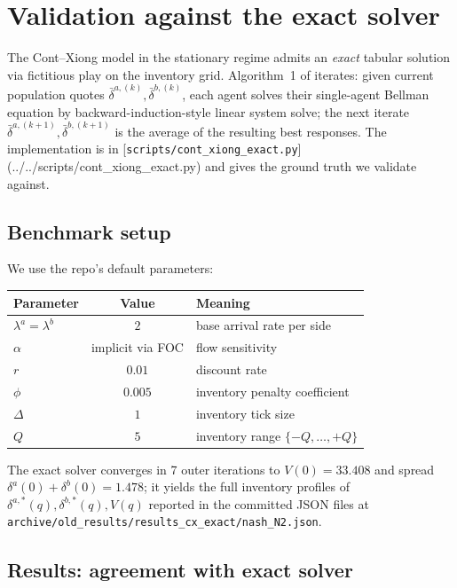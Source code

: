 \section{Validation against the exact solver}
\label{sec:validation}

The Cont--Xiong model in the stationary regime admits an \emph{exact} tabular solution via fictitious play on the inventory grid. Algorithm~1 of \cite{cont2024} iterates: given current population quotes $\bar \delta^{a, (k)}, \bar \delta^{b, (k)}$, each agent solves their single-agent Bellman equation by backward-induction-style linear system solve; the next iterate $\bar \delta^{a, (k+1)}, \bar \delta^{b, (k+1)}$ is the average of the resulting best responses. The implementation is in [\texttt{scripts/cont\_xiong\_exact.py}](../../scripts/cont_xiong_exact.py) and gives the ground truth we validate against.

\subsection{Benchmark setup}

We use the repo's default parameters:
\begin{table}[h]
\centering
\begin{tabular}{@{}lcl@{}}
\toprule
Parameter & Value & Meaning \\ \midrule
$\lambda^a = \lambda^b$ & $2$ & base arrival rate per side \\
$\alpha$ & implicit via FOC & flow sensitivity \\
$r$ & $0.01$ & discount rate \\
$\phi$ & $0.005$ & inventory penalty coefficient \\
$\Delta$ & $1$ & inventory tick size \\
$Q$ & $5$ & inventory range $\{-Q, \ldots, +Q\}$ \\ \bottomrule
\end{tabular}
\end{table}

The exact solver converges in 7 outer iterations to $V(0) = 33.408$ and spread $\delta^a(0) + \delta^b(0) = 1.478$; it yields the full inventory profiles of $\delta^{a,*}(q), \delta^{b,*}(q), V(q)$ reported in the committed JSON files at \texttt{archive/old\_results/results\_cx\_exact/nash\_N2.json}.

\subsection{Results: agreement with exact solver}

